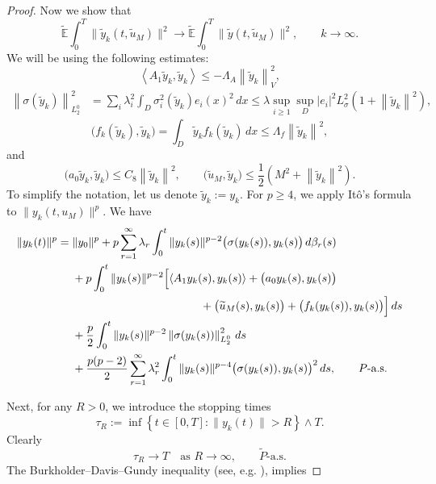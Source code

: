 \documentclass[a4paper,12pt]{article}
\numberwithin{equation}{section}
\begin{document}
\begin{proof}
Now we show that
\begin{equation} \label{3.16}
\widetilde{\mathbb{E}}
\int_0^T
\|
\widetilde{y}_k(t,\widetilde{u}_M)\|^2 \to \widetilde{\mathbb{E}}
\int_0^T
\|
\widetilde{y}(t,\widetilde{u}_M)\|^2,
\qquad k\to\infty.
\end{equation}
We will be using the following estimates:
\[
\left\langle
A_1\widetilde{y}_k,\widetilde{y}_k
\right\rangle
\leq
-\Lambda_A
\left\|
\widetilde{y}_k
\right\|_V^2,
\tag{*1}
\]
\[
\begin{aligned}
\left\|
\sigma(\widetilde{y}_k)
\right\|_{L_2^0}^2
&=
\sum_i \lambda_i^2
\int_D
\sigma_i^2(\widetilde{y}_k)
e_i(x)^2\,dx \leq
\lambda \sup_{i \geq 1}
\sup_D |e_i|^2
L_\sigma^2
\left(
1+\left\|\widetilde{y}_k\right\|^2
\right),
\end{aligned}
\tag{*2}
\]
\[
\bigl(
f_k(\widetilde{y}_k),\widetilde{y}_k
\bigr)
=
\int_D
\widetilde{y}_k
f_k(\widetilde{y}_k)\,dx
\leq
\Lambda_f
\left\|
\widetilde{y}_k
\right\|^2,
\tag{*3}
\]
and
\[
\bigl(
a_0\widetilde{y}_k,\widetilde{y}_k
\bigr)
\leq
C_8
\left\|
\widetilde{y}_k
\right\|^2,
\qquad
\bigl(
\widetilde{u}_M,\widetilde{y}_k
\bigr)
\leq
\frac{1}{2}
\left(
M^2+\left\|\widetilde{y}_k\right\|^2
\right).
\tag{*4}
\]
To simplify the notation, let us denote $\widetilde y_k:= y_k$.
For $p\geq 4$, we apply Itô's formula to
$\|y_k(t,u_M)\|^p$. We have
\begin{align}
\|y_k(t)\|^p
={}&
\|y_0\|^p
+
p\sum_{r=1}^{\infty}\lambda_r
\int_0^t
\|y_k(s)\|^{p-2}
\bigl(
\sigma(y_k(s)),
y_k(s)
\bigr)\,d\beta_r(s)
\nonumber\\
&+
p\int_0^t
\|y_k(s)\|^{p-2}
\Bigl[
\left\langle
A_1 y_k(s),
y_k(s)
\right\rangle
+
\bigl(
a_0 y_k(s),
y_k(s)
\bigr)
\nonumber\\
&\hspace{4cm}
+
\bigl(
\widetilde u_M(s),
y_k(s)
\bigr)
+
\bigl(
f_k(y_k(s)),
y_k(s)
\bigr)
\Bigr]\,ds
\nonumber\\
&+
\frac{p}{2}
\int_0^t
\|y_k(s)\|^{p-2}
\left\|
\sigma(y_k(s))
\right\|_{L_2^0}^2\,ds
\nonumber\\
&+
\frac{p(p-2)}{2}
\sum_{r=1}^{\infty}\lambda_r^2
\int_0^t
\|y_k(s)\|^{p-4}
\bigl(
\sigma(y_k(s)),
y_k(s)
\bigr)^2\,ds,
\qquad P\text{-a.s.}
\label{3.22}
\end{align}

Next, for any $R>0$, we introduce the stopping times
\[
\tau_R
:=
\inf
\left\{
t\in[0,T]:
\|y_k(t)\|>R
\right\}
\wedge T.
\]
Clearly 
\begin{equation}
\tau_R \to T
\quad\text{as }R\to\infty,
\qquad
\widetilde{P}\text{-a.s.}
\label{3.23}
\end{equation}
The Burkholder--Davis--Gundy inequality (see, e.g.
\cite[Theorem 3.28]{29}), implies


\end{proof}
\end{document}
